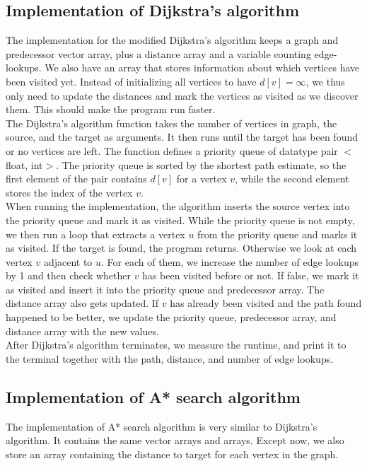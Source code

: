 \documentclass[11pt]{article}
\begin{document}
\subsection{Implementation of Dijkstra's algorithm}
The implementation for the modified Dijkstra's algorithm keeps a graph and predecessor vector array, plus a distance array and a variable counting edge-lookups. We also have an array that stores information about which vertices have been visited yet. Instead of initializing all vertices to have $d[v]=\infty$, we thus only need to update the distances and mark the vertices as visited as we discover them. This should make the program run faster.\\

\noindent The Dijkstra's algorithm function takes the number of vertices in graph, the source, and the target as arguments. It then runs until the target has been found or no vertices are left. The function defines a priority queue of datatype pair $<$float, int$>$.  The priority queue is sorted by the shortest path estimate, so the first element of the pair contains $d[v]$ for a vertex $v$, while the second element stores the index of the vertex $v$.\\

\noindent When running the implementation, the algorithm inserts the source vertex into the priority queue and mark it as visited. While the priority queue is not empty, we then run a loop that extracts a vertex $u$ from the priority queue and marks it as visited. If the target is found, the program returns. Otherwise we look at each vertex $v$ adjacent to $u$. For each of them, we increase the number of edge lookups by 1 and then check whether $v$ has been visited before or not. If false, we mark it as visited and insert it into the priority queue and predecessor array. The distance array also gets updated. If $v$ has already been visited and the path found happened to be better, we update the priority queue, predecessor array, and distance array with the new values.\\

\noindent After Dijkstra's algorithm terminates, we measure the runtime, and print it to the terminal together with the path, distance, and number of edge lookups.\\

\subsection{Implementation of A* search algorithm}
The implementation of A* search algorithm is very similar to Dijkstra's algorithm. It contains the same vector arrays and arrays. Except now, we also store an array containing the distance to target for each vertex in the graph.\\
\end{document}
